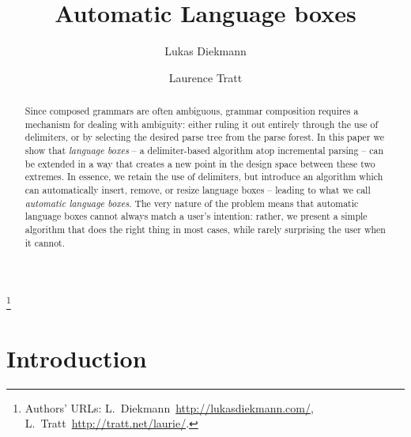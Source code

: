 \documentclass[sigplan,screen]{acmart}\settopmatter{printfolios=true,printccs=false,printacmref=false}
\begin{document}
\title{Automatic Language boxes}

\author{Lukas Diekmann}
\author{Laurence Tratt}
\thanks{Authors' URLs: %
    L.~Diekmann~\url{http://lukasdiekmann.com/},
    L.~Tratt~\url{http://tratt.net/laurie/}.
}


\begin{abstract}
Since composed grammars are often ambiguous, grammar composition requires a
mechanism for dealing with ambiguity: either ruling it out entirely through the use of
delimiters, or by selecting the desired parse tree from the parse forest.  In
this paper we show that \emph{language boxes} -- a delimiter-based
algorithm atop incremental parsing -- can be extended in a way that creates
a new point in the design space between these two extremes. In essence, we
retain the use of delimiters, but
introduce an algorithm which can automatically insert, remove, or resize
language boxes -- leading to what we call \emph{automatic language
boxes}. The very nature of the problem means that automatic language boxes
cannot always match a user's intention: rather, we present a simple
algorithm that does the right thing in most cases, while rarely surprising the
user when it cannot.
\end{abstract}


\maketitle

\section{Introduction}
\end{document}
